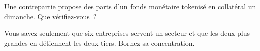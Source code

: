 \begin{interviewq}\label{iq:fm:competition-and-the-future:5}
Une contrepartie propose des parts d'un fonds monétaire tokenisé en collatéral un dimanche. Que vérifiez-vous~?
\end{interviewq}

\begin{interviewq}\label{iq:fm:competition-and-the-future:6}
Vous savez seulement que six entreprises servent un secteur et que les deux plus grandes en détiennent les deux tiers. Bornez sa concentration.
\end{interviewq}
